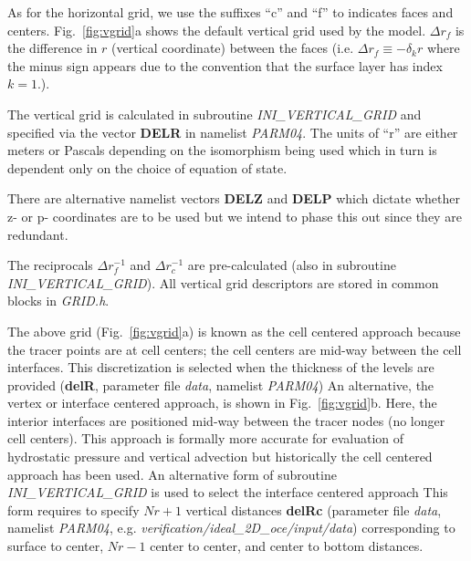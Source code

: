 As for the horizontal grid, we use the suffixes ``c'' and ``f'' to
indicates faces and centers. Fig.~\ref{fig:vgrid}a shows the default
vertical grid used by the model.
$\Delta r_f$ is the difference in $r$
(vertical coordinate) between the faces (i.e. $\Delta r_f \equiv -
\delta_k r$ where the minus sign appears due to the convention that the
surface layer has index $k=1$.).

The vertical grid is calculated in subroutine {\em
INI\_VERTICAL\_GRID} and specified via the vector {\bf DELR} in
namelist {\em PARM04}. The units of ``r'' are either meters or Pascals
depending on the isomorphism being used which in turn is dependent
only on the choice of equation of state.

There are alternative namelist vectors {\bf DELZ} and {\bf DELP} which
dictate whether z- or
p- coordinates are to be used but we intend to
phase this out since they are redundant.

The reciprocals $\Delta r_f^{-1}$ and $\Delta r_c^{-1}$ are
pre-calculated (also in subroutine {\em INI\_VERTICAL\_GRID}). All
vertical grid descriptors are stored in common blocks in {\em GRID.h}.

The above grid (Fig.~\ref{fig:vgrid}a) is known as the cell centered
approach because the tracer points are at cell centers; the cell
centers are mid-way between the cell interfaces. 
This discretization is selected when the thickness of the
levels are provided ({\bf delR}, parameter file {\em data}, 
namelist {\em PARM04})
An alternative, the vertex or interface centered approach, is shown in
Fig.~\ref{fig:vgrid}b. Here, the interior interfaces are positioned
mid-way between the tracer nodes (no longer cell centers). This
approach is formally more accurate for evaluation of hydrostatic
pressure and vertical advection but historically the cell centered
approach has been used. An alternative form of subroutine {\em
INI\_VERTICAL\_GRID} is used to select the interface centered approach
This form requires to specify $Nr+1$ vertical distances {\bf delRc} 
(parameter file {\em data}, namelist {\em PARM04}, e.g. 
{\em verification/ideal\_2D\_oce/input/data})
corresponding to surface to center, $Nr-1$ center to center, and center to 
bottom distances.



